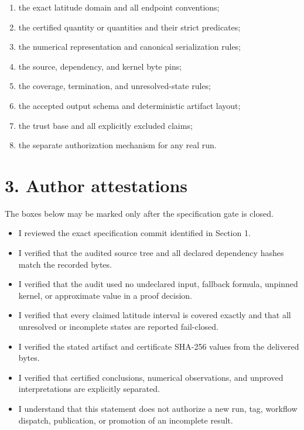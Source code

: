 \documentclass[11pt]{article}
\begin{document}
\begin{enumerate}[label=\arabic*.]
\item the exact latitude domain and all endpoint conventions;
\item the certified quantity or quantities and their strict predicates;
\item the numerical representation and canonical serialization rules;
\item the source, dependency, and kernel byte pins;
\item the coverage, termination, and unresolved-state rules;
\item the accepted output schema and deterministic artifact layout;
\item the trust base and all explicitly excluded claims;
\item the separate authorization mechanism for any real run.
\end{enumerate}

\section*{3. Author attestations}

The boxes below may be marked only after the specification gate is closed.

\begin{itemize}[label={[\ ]}]
\item I reviewed the exact specification commit identified in Section 1.
\item I verified that the audited source tree and all declared dependency
      hashes match the recorded bytes.
\item I verified that the audit used no undeclared input, fallback formula,
      unpinned kernel, or approximate value in a proof decision.
\item I verified that every claimed latitude interval is covered exactly and
      that all unresolved or incomplete states are reported fail-closed.
\item I verified the stated artifact and certificate SHA-256 values from the
      delivered bytes.
\item I verified that certified conclusions, numerical observations, and
      unproved interpretations are explicitly separated.
\item I understand that this statement does not authorize a new run, tag,
      workflow dispatch, publication, or promotion of an incomplete result.
\end{itemize}
\end{document}
